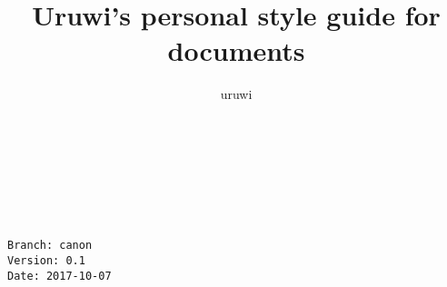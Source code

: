 \documentclass{book}
\title{Uruwi's personal style guide for documents}
\author{uruwi}
\newcommand{\lname}{aaaaaaaaaaA}
\begin{document}
\pagecolor{Goldenrod!25}

\begin{titlepage}
    \makeatletter
    \begin{center}
        {\color{RedOrange} \hprule \vspace{1.5ex} \\}
        {\Huge \textcolor{BrickRed}{\@title}\\}
        {\color{RedOrange} \hprule \vspace{1.5ex} \\}
        \vspace{1.5cm}
        {\Large\bfseries \@author}\\[5pt]
        \vspace{2cm}
        \vfill
        \vfill
        {\@date}
    \end{center}
    \makeatother
\end{titlepage}

\pagecolor{Goldenrod!15}

\begin{verbatim}
Branch: canon
Version: 0.1
Date: 2017-10-07
\end{verbatim}
\end{document}

